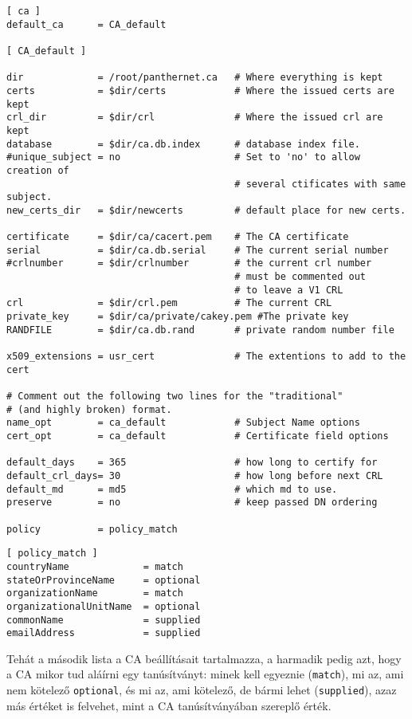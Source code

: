 \begin{Verbatim}[frame=single,label=CA beállítások]
[ ca ]
default_ca      = CA_default

[ CA_default ]

dir             = /root/panthernet.ca   # Where everything is kept
certs           = $dir/certs            # Where the issued certs are kept
crl_dir         = $dir/crl              # Where the issued crl are kept
database        = $dir/ca.db.index      # database index file.
#unique_subject = no                    # Set to 'no' to allow creation of
                                        # several ctificates with same subject.
new_certs_dir   = $dir/newcerts         # default place for new certs.

certificate     = $dir/ca/cacert.pem    # The CA certificate
serial          = $dir/ca.db.serial     # The current serial number
#crlnumber      = $dir/crlnumber        # the current crl number
                                        # must be commented out
                                        # to leave a V1 CRL
crl             = $dir/crl.pem          # The current CRL
private_key     = $dir/ca/private/cakey.pem #The private key
RANDFILE        = $dir/ca.db.rand       # private random number file

x509_extensions = usr_cert              # The extentions to add to the cert

# Comment out the following two lines for the "traditional"
# (and highly broken) format.
name_opt        = ca_default            # Subject Name options
cert_opt        = ca_default            # Certificate field options

default_days    = 365                   # how long to certify for
default_crl_days= 30                    # how long before next CRL
default_md      = md5                   # which md to use.
preserve        = no                    # keep passed DN ordering

policy          = policy_match
\end{Verbatim}


\begin{Verbatim}[frame=single]
[ policy_match ]
countryName             = match
stateOrProvinceName     = optional
organizationName        = match
organizationalUnitName  = optional
commonName              = supplied
emailAddress            = supplied
\end{Verbatim}


Tehát a  második lista a CA beállításait tartalmazza, a harmadik pedig azt, hogy a CA mikor tud aláírni egy
tanúsítványt: minek kell egyeznie (\texttt{match}), mi az, ami nem kötelező \texttt{optional}, és mi az, ami kötelező,
de bármi lehet (\texttt{supplied}), azaz más értéket is felvehet, mint a CA tanúsítványában szereplő érték.

